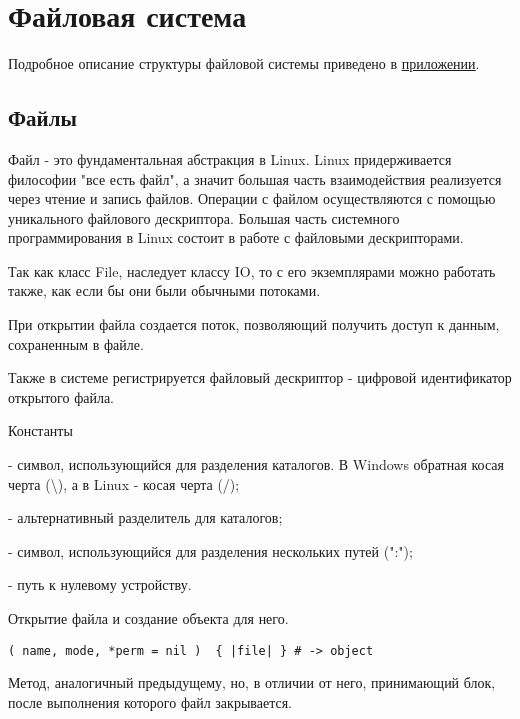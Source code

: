 \section{Файловая система}

Подробное описание структуры файловой системы приведено в \hyperlink{appfile}{\underline{приложении}}.

\subsection{Файлы}

Файл - это фундаментальная абстракция в Linux. Linux придерживается философии "все есть файл", а значит большая часть взаимодействия реализуется через чтение и запись файлов. Операции с файлом осуществляются с помощью уникального файлового дескриптора. Большая часть системного программирования в Linux состоит в работе с файловыми дескрипторами.

Так как класс File, наследует классу IO, то с его экземплярами можно работать также, как если бы они были обычными потоками.

При открытии файла создается поток, позволяющий получить доступ к данным, сохраненным в файле.

Также в системе регистрируется файловый дескриптор - цифровой идентификатор открытого файла.

\begin{keylist}{Константы}
  
   - символ, использующийся для разделения каталогов. В Windows обратная косая черта (\textbackslash), а в Linux - косая черта (/); 
  
   - альтернативный разделитель для каталогов;
  
   - символ, использующийся для разделения нескольких путей (":");
  
   - путь к нулевому устройству.
\end{keylist}

\begin{methodlist}
  Открытие файла и создание объекта для него. 
  
  \verb!( name, mode, *perm = nil )  { |file| } # -> object!
  
  Метод, аналогичный предыдущему, но, в отличии от него, принимающий блок, после выполнения которого файл закрывается.
\end{methodlist}

